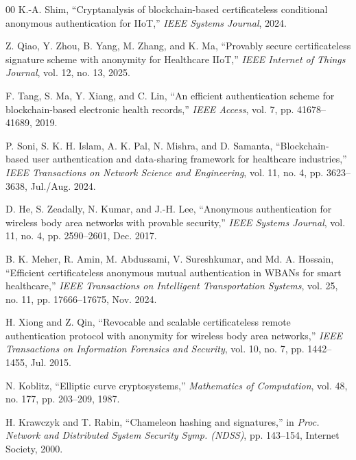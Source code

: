 \documentclass[conference]{IEEEtran}
\begin{document}
\begin{thebibliography}{00}
 K.-A. Shim,
``Cryptanalysis of blockchain-based certificateless conditional anonymous authentication for IIoT,''
\textit{IEEE Systems Journal}, 2024.

 Z. Qiao, Y. Zhou, B. Yang, M. Zhang, and K. Ma,
``Provably secure certificateless signature scheme with anonymity for Healthcare IIoT,''
\textit{IEEE Internet of Things Journal}, vol. 12, no. 13, 2025.

 F. Tang, S. Ma, Y. Xiang, and C. Lin,
``An efficient authentication scheme for blockchain-based electronic health records,''
\textit{IEEE Access}, vol. 7, pp. 41678--41689, 2019.

 P. Soni, S. K. H. Islam, A. K. Pal, N. Mishra, and D. Samanta,
``Blockchain-based user authentication and data-sharing framework for healthcare industries,''
\textit{IEEE Transactions on Network Science and Engineering}, vol. 11, no. 4, pp. 3623--3638, Jul./Aug. 2024.

 D. He, S. Zeadally, N. Kumar, and J.-H. Lee,
``Anonymous authentication for wireless body area networks with provable security,''
\textit{IEEE Systems Journal}, vol. 11, no. 4, pp. 2590--2601, Dec. 2017.

 B. K. Meher, R. Amin, M. Abdussami, V. Sureshkumar, and Md. A. Hossain,
``Efficient certificateless anonymous mutual authentication in WBANs for smart healthcare,''
\textit{IEEE Transactions on Intelligent Transportation Systems}, vol. 25, no. 11, pp. 17666--17675, Nov. 2024.

 H. Xiong and Z. Qin,
``Revocable and scalable certificateless remote authentication protocol with anonymity for wireless body area networks,''
\textit{IEEE Transactions on Information Forensics and Security}, vol. 10, no. 7, pp. 1442--1455, Jul. 2015.

 N. Koblitz,
``Elliptic curve cryptosystems,''
\textit{Mathematics of Computation}, vol. 48, no. 177, pp. 203--209, 1987.

 H. Krawczyk and T. Rabin,
``Chameleon hashing and signatures,''
in \textit{Proc. Network and Distributed System Security Symp. (NDSS)},
pp. 143--154, Internet Society, 2000.

\end{thebibliography}
\end{document}
